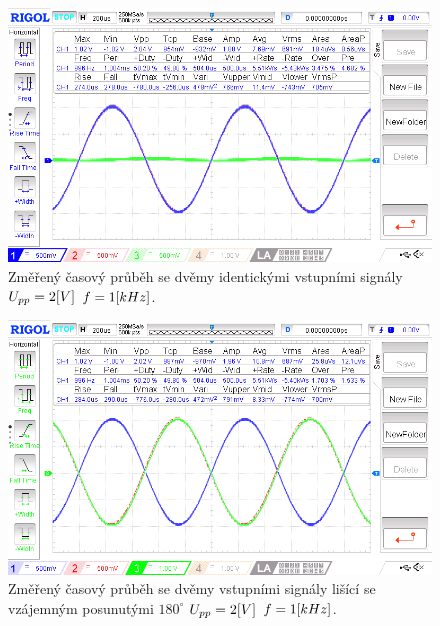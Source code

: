\documentclass{article}
\begin{document}
\begin{figure}[H]
  \begin{minipage}[t]{0.48\textwidth}
    \centering
    \includegraphics[width=\textwidth]{LAB/NewFile8.png}
    Změřený časový průběh se dvěmy identickými vstupními signály \(U_{pp} = 2\-[V]\) \(f = 1\-[kHz]\).
  \end{minipage}
  \hfill
  \begin{minipage}[t]{0.48\textwidth}
    \centering
    \includegraphics[width=\textwidth]{LAB/NewFile9.png}
    Změřený časový průběh se dvěmy vstupními signály lišící se vzájemným posunutými \(180^\circ\) \(U_{pp} = 2\-[V]\) \(f = 1\-[kHz]\).
  \end{minipage}
\end{figure}
\end{document}
